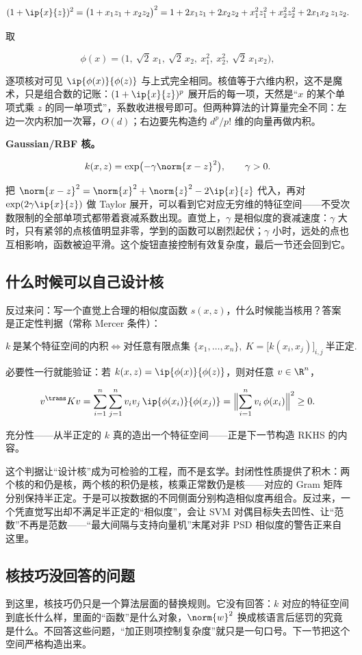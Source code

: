 \[
(1+\ip{x}{z})^{2}
=\bigl(1+x_1z_1+x_2z_2\bigr)^2
=1+2x_1z_1+2x_2z_2+x_1^2z_1^2+x_2^2z_2^2+2x_1x_2\,z_1z_2.
\]

取

\[
\phi(x)=\bigl(1,\ \sqrt2\,x_1,\ \sqrt2\,x_2,\ x_1^2,\ x_2^2,\ \sqrt2\,x_1x_2\bigr),
\]

逐项核对可见 \(\ip{\phi(x)}{\phi(z)}\) 与上式完全相同。核值等于六维内积，这不是魔术，只是组合数的记账：\((1+\ip{x}{z})^p\) 展开后的每一项，天然是``\(x\) 的某个单项式乘 \(z\) 的同一单项式''，系数收进根号即可。但两种算法的计算量完全不同：左边一次内积加一次幂，\(O(d)\)；右边要先构造约 \(d^p/p!\) 维的向量再做内积。

\textbf{Gaussian/RBF 核。}

\[
k(x,z)=\exp\bigl(-\gamma\norm{x-z}^{2}\bigr),\qquad \gamma>0.
\]

把 \(\norm{x-z}^{2}=\norm{x}^{2}+\norm{z}^{2}-2\ip{x}{z}\) 代入，再对 \(\exp(2\gamma\ip{x}{z})\) 做 Taylor 展开，可以看到它对应无穷维的特征空间——不受次数限制的全部单项式都带着衰减系数出现。直觉上，\(\gamma\) 是相似度的衰减速度：\(\gamma\) 大时，只有紧邻的点核值明显非零，学到的函数可以剧烈起伏；\(\gamma\) 小时，远处的点也互相影响，函数被迫平滑。这个旋钮直接控制有效复杂度，最后一节还会回到它。

\subsection{什么时候可以自己设计核}

反过来问：写一个直觉上合理的相似度函数 \(s(x,z)\)，什么时候能当核用？答案是正定性判据（常称 Mercer 条件）：

\[
k\ \text{是某个特征空间的内积}
\iff
\text{对任意有限点集 } \{x_1,\dots,x_n\},
\ K=\bigl[k(x_i,x_j)\bigr]_{i,j}\ \text{半正定}.
\]

必要性一行就能验证：若 \(k(x,z)=\ip{\phi(x)}{\phi(z)}\)，则对任意 \(v\in\R^n\)，

\[
v^{\trans}Kv
=\sum_{i=1}^{n}\sum_{j=1}^{n}v_iv_j\,\ip{\phi(x_i)}{\phi(x_j)}
=\Bigl\lVert\sum_{i=1}^{n}v_i\,\phi(x_i)\Bigr\rVert^{2}\ge0.
\]

充分性——从半正定的 \(k\) 真的造出一个特征空间——正是下一节构造 RKHS 的内容。

这个判据让``设计核''成为可检验的工程，而不是玄学。封闭性性质提供了积木：两个核的和仍是核，两个核的积仍是核，核乘正常数仍是核——对应的 Gram 矩阵分别保持半正定。于是可以按数据的不同侧面分别构造相似度再组合。反过来，一个凭直觉写出却不满足半正定的``相似度''，会让 SVM 对偶目标失去凹性、让``范数''不再是范数——``最大间隔与支持向量机''末尾对非 PSD 相似度的警告正来自这里。

\subsection{核技巧没回答的问题}

到这里，核技巧仍只是一个算法层面的替换规则。它没有回答：\(k\) 对应的特征空间到底长什么样，里面的``函数''是什么对象，\(\norm{w}^{2}\) 换成核语言后惩罚的究竟是什么。不回答这些问题，``加正则项控制复杂度''就只是一句口号。下一节把这个空间严格构造出来。
